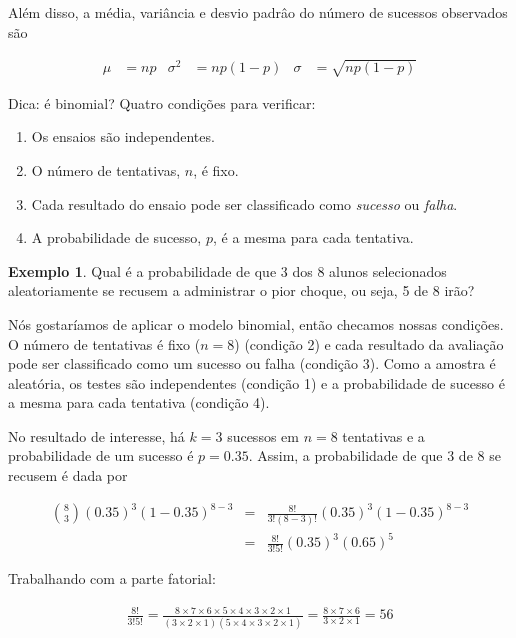 \documentclass[
]{book}
\theoremstyle{definition}
\theoremstyle{definition}
\newtheorem{example}{Exemplo}[chapter]
\theoremstyle{definition}
\theoremstyle{definition}
\theoremstyle{remark}
\begin{document}
Além disso, a média, variância e desvio padrâo do número de sucessos observados são

\begin{align}
\mu &= np
    &\sigma^2 &= np(1-p)
    &\sigma &= \sqrt{np(1-p)}
\label{eq:binf}
\end{align}

Dica: é binomial? Quatro condições para verificar:

\begin{enumerate}
\def\labelenumi{(\arabic{enumi})}
\item
  Os ensaios são independentes.
\item
  O número de tentativas, \(n\), é fixo.
\item
  Cada resultado do ensaio pode ser classificado como \emph{sucesso} ou \emph{falha}.
\item
  A probabilidade de sucesso, \(p\), é a mesma para cada tentativa.
\end{enumerate}

\begin{example}
\protect\hypertarget{exm:unnamed-chunk-128}{}{\label{exm:unnamed-chunk-128} }Qual é a probabilidade de que 3 dos 8 alunos selecionados aleatoriamente se recusem a administrar o pior choque, ou seja, 5 de 8 irão?
\end{example}

Nós gostaríamos de aplicar o modelo binomial, então checamos nossas condições. O número de tentativas é fixo (\(n=8\)) (condição 2) e cada resultado da avaliação pode ser classificado como um sucesso ou falha (condição 3). Como a amostra é aleatória, os testes são independentes (condição 1) e a probabilidade de sucesso é a mesma para cada tentativa (condição 4).

No resultado de interesse, há \(k=3\) sucessos em \(n=8\) tentativas e a probabilidade de um sucesso é \(p= 0.35\). Assim, a probabilidade de que 3 de 8 se recusem é dada por

\begin{eqnarray*}
{ 8 \choose 3}(0.35)^3(1-0.35)^{8-3}
    &=& \frac{8!}{3!(8-3)!}(0.35)^3(1-0.35)^{8-3} \\
    &=& \frac{8!}{3!5!}(0.35)^3(0.65)^5
\end{eqnarray*}

Trabalhando com a parte fatorial:

\begin{eqnarray*}
\frac{8!}{3!5!} = \frac{8\times7\times6\times5\times4\times3\times2\times1}{(3\times2\times1)(5\times4\times3\times2\times1)} = \frac{8\times7\times6}{3\times2\times1} = 56
\end{eqnarray*}
\end{document}
